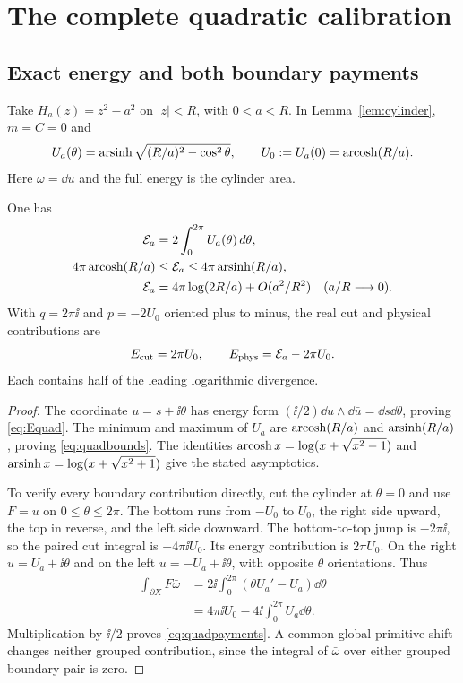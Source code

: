 \section{The complete quadratic calibration}\label{sec:quadratic}

\subsection{Exact energy and both boundary payments}
Take $H_a(z)=z^2-a^2$ on $|z|<R$, with $0<a<R$. In
Lemma~\ref{lem:cylinder}, $m=C=0$ and
\begin{equation}\label{eq:Uround}
 U_a(\theta)=\operatorname{arsinh}\sqrt{(R/a)^2-\cos^2\theta},\qquad
 U_0:=U_a(0)=\operatorname{arcosh}(R/a).
\end{equation}
Here $\omega=\dd u$ and the full energy is the cylinder area.
\begin{proposition}\label{prop:quadratic}
One has
\begin{align}
 \mathcal E_a&=2\int_0^{2\pi}U_a(\theta)\,d\theta,
 \label{eq:Equad}\\
 4\pi\operatorname{arcosh}(R/a)&\le\mathcal E_a\le4\pi\operatorname{arsinh}(R/a),
 \label{eq:quadbounds}\\
 \mathcal E_a&=4\pi\log(2R/a)+O(a^2/R^2)\quad(a/R\longrightarrow0).
 \label{eq:quadasymp}
\end{align}
With $q=2\pi\ii$ and $p=-2U_0$ oriented plus to minus, the real
cut and physical contributions are
\begin{equation}\label{eq:quadpayments}
 E_{\mathrm{cut}}=2\pi U_0,\qquad
 E_{\mathrm{phys}}=\mathcal E_a-2\pi U_0.
\end{equation}
Each contains half of the leading logarithmic divergence.
\end{proposition}
\begin{proof}
The coordinate $u=s+\ii\theta$ has energy form
$(\ii/2)\dd u\wedge\dd\bar u=\dd s\dd\theta$, proving
\eqref{eq:Equad}. The minimum and maximum of $U_a$ are
$\operatorname{arcosh}(R/a)$ and $\operatorname{arsinh}(R/a)$, proving \eqref{eq:quadbounds}.
The identities
$\operatorname{arcosh} x=\log(x+\sqrt{x^2-1})$ and
$\operatorname{arsinh} x=\log(x+\sqrt{x^2+1})$ give the stated asymptotics.

To verify every boundary contribution directly, cut the cylinder at
$\theta=0$ and use $F=u$ on $0\le\theta\le2\pi$.
The bottom runs from $-U_0$ to $U_0$, the right side upward,
the top in reverse, and the left side downward. The bottom-to-top jump
is $-2\pi\ii$, so the paired cut integral is $-4\pi\ii U_0$.
Its energy contribution is $2\pi U_0$.
On the right $u=U_a+\ii\theta$ and on the left
$u=-U_a+\ii\theta$, with opposite $\theta$ orientations. Thus
\begin{align*}
 \int_{\partial X}F\bar\omega
 &=2\ii\int_0^{2\pi}(\theta U_a'-U_a)\dd\theta\\
 &=4\pi\ii U_0-4\ii\int_0^{2\pi}U_a\dd\theta.
\end{align*}
Multiplication by $\ii/2$ proves \eqref{eq:quadpayments}. A common
global primitive shift changes neither grouped contribution, since the
integral of $\bar\omega$ over either grouped boundary pair is zero.
\end{proof}

